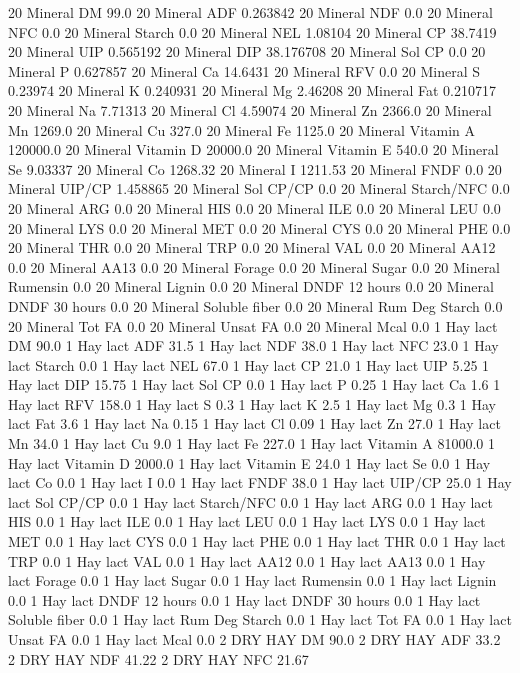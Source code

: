 \documentclass[letterpaper,10pt,english]{sphinxmanual}
\begin{document}
\begin{sphinxVerbatim}[commandchars=\\\{\},numbers=left,firstnumber=1,stepnumber=1]
20 Mineral DM 99.0
20 Mineral ADF 0.263842
20 Mineral NDF 0.0
20 Mineral NFC 0.0
20 Mineral Starch 0.0
20 Mineral NEL 1.08104
20 Mineral CP 38.7419
20 Mineral UIP 0.565192
20 Mineral DIP 38.176708
20 Mineral Sol CP 0.0
20 Mineral P 0.627857
20 Mineral Ca 14.6431
20 Mineral RFV 0.0
20 Mineral S 0.23974
20 Mineral K 0.240931
20 Mineral Mg 2.46208
20 Mineral Fat 0.210717
20 Mineral Na 7.71313
20 Mineral Cl 4.59074
20 Mineral Zn 2366.0
20 Mineral Mn 1269.0
20 Mineral Cu 327.0
20 Mineral Fe 1125.0
20 Mineral Vitamin A 120000.0
20 Mineral Vitamin D 20000.0
20 Mineral Vitamin E 540.0
20 Mineral Se 9.03337
20 Mineral Co 1268.32
20 Mineral I 1211.53
20 Mineral FNDF 0.0
20 Mineral UIP/CP 1.458865
20 Mineral Sol CP/CP 0.0
20 Mineral Starch/NFC 0.0
20 Mineral ARG 0.0
20 Mineral HIS 0.0
20 Mineral ILE 0.0
20 Mineral LEU 0.0
20 Mineral LYS 0.0
20 Mineral MET 0.0
20 Mineral CYS 0.0
20 Mineral PHE 0.0
20 Mineral THR 0.0
20 Mineral TRP 0.0
20 Mineral VAL 0.0
20 Mineral AA\PYGZsh{}12 0.0
20 Mineral AA\PYGZsh{}13 0.0
20 Mineral \PYGZpc{} Forage 0.0
20 Mineral Sugar \PYGZpc{} 0.0
20 Mineral Rumensin 0.0
20 Mineral Lignin 0.0
20 Mineral DNDF 12 hours 0.0
20 Mineral DNDF 30 hours 0.0
20 Mineral Soluble fiber 0.0
20 Mineral Rum Deg Starch 0.0
20 Mineral Tot FA 0.0
20 Mineral Unsat FA 0.0
20 Mineral Mcal 0.0
1 Hay lact DM 90.0
1 Hay lact ADF 31.5
1 Hay lact NDF 38.0
1 Hay lact NFC 23.0
1 Hay lact Starch 0.0
1 Hay lact NEL 67.0
1 Hay lact CP 21.0
1 Hay lact UIP 5.25
1 Hay lact DIP 15.75
1 Hay lact Sol CP 0.0
1 Hay lact P 0.25
1 Hay lact Ca 1.6
1 Hay lact RFV 158.0
1 Hay lact S 0.3
1 Hay lact K 2.5
1 Hay lact Mg 0.3
1 Hay lact Fat 3.6
1 Hay lact Na 0.15
1 Hay lact Cl 0.09
1 Hay lact Zn 27.0
1 Hay lact Mn 34.0
1 Hay lact Cu 9.0
1 Hay lact Fe 227.0
1 Hay lact Vitamin A 81000.0
1 Hay lact Vitamin D 2000.0
1 Hay lact Vitamin E 24.0
1 Hay lact Se 0.0
1 Hay lact Co 0.0
1 Hay lact I 0.0
1 Hay lact FNDF 38.0
1 Hay lact UIP/CP 25.0
1 Hay lact Sol CP/CP 0.0
1 Hay lact Starch/NFC 0.0
1 Hay lact ARG 0.0
1 Hay lact HIS 0.0
1 Hay lact ILE 0.0
1 Hay lact LEU 0.0
1 Hay lact LYS 0.0
1 Hay lact MET 0.0
1 Hay lact CYS 0.0
1 Hay lact PHE 0.0
1 Hay lact THR 0.0
1 Hay lact TRP 0.0
1 Hay lact VAL 0.0
1 Hay lact AA\PYGZsh{}12 0.0
1 Hay lact AA\PYGZsh{}13 0.0
1 Hay lact \PYGZpc{} Forage 0.0
1 Hay lact Sugar \PYGZpc{} 0.0
1 Hay lact Rumensin 0.0
1 Hay lact Lignin 0.0
1 Hay lact DNDF 12 hours 0.0
1 Hay lact DNDF 30 hours 0.0
1 Hay lact Soluble fiber 0.0
1 Hay lact Rum Deg Starch 0.0
1 Hay lact Tot FA 0.0
1 Hay lact Unsat FA 0.0
1 Hay lact Mcal 0.0
2 DRY HAY DM 90.0
2 DRY HAY ADF 33.2
2 DRY HAY NDF 41.22
2 DRY HAY NFC 21.67

\end{sphinxVerbatim}
\end{document}
